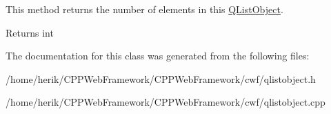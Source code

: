 This method returns the number of elements in this \hyperlink{class_q_list_object}{Q\+List\+Object}. 

\begin{DoxyReturn}{Returns}
int 
\end{DoxyReturn}


The documentation for this class was generated from the following files\+:\begin{DoxyCompactItemize}
\item 
/home/herik/\+C\+P\+P\+Web\+Framework/\+C\+P\+P\+Web\+Framework/cwf/qlistobject.\+h\item 
/home/herik/\+C\+P\+P\+Web\+Framework/\+C\+P\+P\+Web\+Framework/cwf/qlistobject.\+cpp\end{DoxyCompactItemize}
